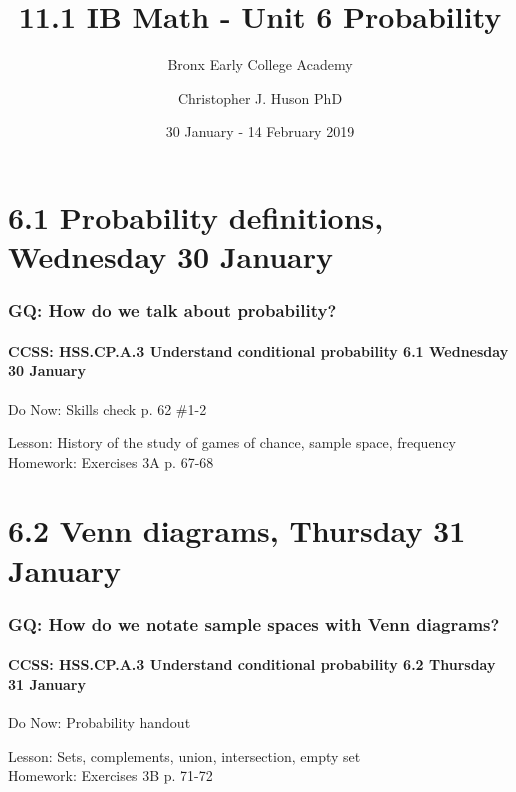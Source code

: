 \documentclass{beamer}
\title{11.1 IB Math - Unit 6 Probability}
\subtitle{Bronx Early College Academy}
\author{Christopher J. Huson PhD}
\date{30 January - 14 February 2019}
\begin{document}
\frame{\titlepage}

\section[Outline]{}
\frame{\tableofcontents}

\section{6.1 Probability definitions, Wednesday 30 January}
  \frame
  {
    \frametitle{GQ: How do we talk about probability?}
    \framesubtitle{CCSS: HSS.CP.A.3 Understand conditional probability \hfill \alert{6.1 Wednesday 30 January}}

    \begin{block}{Do Now: Skills check p. 62 \#1-2}
    \end{block}
    Lesson: History of the study of games of chance, sample space, frequency \\ \bigskip
    Homework: Exercises 3A p. 67-68
  }


\section{6.2 Venn diagrams, Thursday 31 January}
  \frame
  {
    \frametitle{GQ: How do we notate sample spaces with Venn diagrams?}
    \framesubtitle{CCSS: HSS.CP.A.3 Understand conditional probability \hfill  \alert{6.2 Thursday 31 January}}

    \begin{block}{Do Now: Probability handout}
    \end{block}
    Lesson: Sets, complements, union, intersection, empty set \\ \bigskip
    Homework: Exercises 3B p. 71-72
  }
\end{document}
